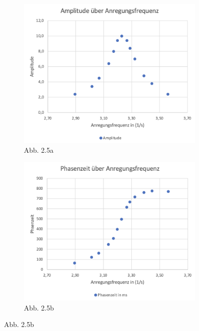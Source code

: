             \begin{figure}[H]
                \begin{subfigure}{0.48\textwidth}
                    \centering
                    \includegraphics[width=\textwidth]{bilder/plot_v3_1.png}
                    \caption{Abb. 2.5a}
                    \label{fig:plot_v3_1}
                \end{subfigure}
                \begin{subfigure}{0.48\textwidth}
                    \centering
                    \includegraphics[width=\textwidth]{bilder/plot_v3_2.png}
                    \caption{Abb. 2.5b}
                    \label{fig:plot_v3_2}
                \end{subfigure}
            \end{figure}
        
